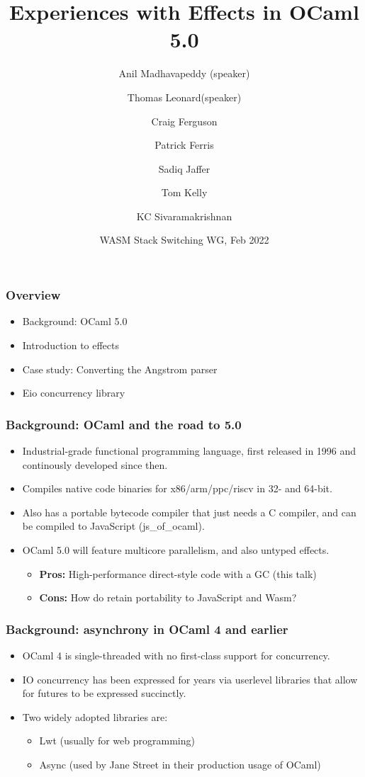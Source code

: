\documentclass{beamer}
\title[Effects]{Experiences with Effects in OCaml 5.0}
\author[Anil Madhavapeddy and Thomas Leonard]
{Anil Madhavapeddy (speaker) \and Thomas Leonard(speaker) \and Craig Ferguson\and Patrick Ferris\and Sadiq Jaffer\and Tom Kelly \and KC Sivaramakrishnan}
\institute{University of Cambridge and Tarides}
\date[Wasm Stack Switching WG]{WASM Stack Switching WG, Feb 2022}
\begin{document}

\frame{\titlepage}


\begin{frame}
	\frametitle{Overview}
	\begin{itemize}
		\item {Background: OCaml 5.0}
		\item Introduction to effects
		\item Case study: Converting the Angstrom parser
		\item Eio concurrency library
	\end{itemize}
\end{frame}

\begin{frame}[fragile]
	\frametitle{Background: OCaml and the road to 5.0}
	\begin{itemize}
		\item Industrial-grade functional programming language, first released in 1996 and continously developed since then.
    \item Compiles native code binaries for x86/arm/ppc/riscv in 32- and 64-bit.
    \item Also has a portable bytecode compiler that just needs a C compiler, and can
    be compiled to JavaScript (js\_of\_ocaml).
		\item OCaml 5.0 will feature multicore parallelism, and also untyped effects.
		\begin{itemize}
      \item \textbf{Pros:} High-performance direct-style code with a GC (this talk)
      \item \textbf{Cons:} How do retain portability to JavaScript and Wasm?
    \end{itemize}
	\end{itemize}
\end{frame}

\begin{frame}[fragile]
	\frametitle{Background: asynchrony in OCaml 4 and earlier}
	\begin{itemize}
		\item OCaml 4 is single-threaded with no first-class support for concurrency.
    \item IO concurrency has been expressed for years via userlevel libraries that
    allow for futures to be expressed succinctly.
    \item Two widely adopted libraries are:
    \begin{itemize}
      \item Lwt (usually for web programming)
      \item Async (used by Jane Street in their production usage of OCaml)
	  \end{itemize}
  \end{itemize}
\end{frame}
\end{document}
